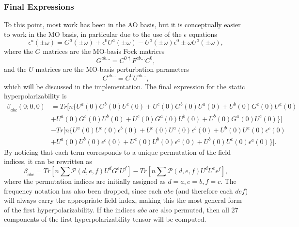 \subsubsection{Final Expressions}

To this point, most work has been in the AO basis, but it is conceptually easier to work in the MO basis, in particular due to the use of the \(\epsilon\) equations
\begin{equation}
  \epsilon^{a}(\pm\omega) = G^{a}(\pm\omega) + \epsilon^{0} U^{a}(\pm\omega) - U^{a}(\pm\omega) \epsilon^{0} \pm \omega U^{a}(\pm\omega), \tag{Karna 34}
\end{equation}
where the \(G\) matrices are the MO-basis Fock matrices
\begin{equation}
  G^{ab\dots} = C^{0\dagger} F^{ab\dots} C^{0},
\end{equation}
and the \(U\) matrices are the MO-basis perturbation parameters
\begin{equation}
  C^{ab\dots} = C^{0} U^{ab\dots},
\end{equation}
which will be discussed in the implementation. The final expression for the static hyperpolarizability is
\begin{equation}
  \begin{split}
    \beta_{abc}(0; 0, 0) &= Tr[n \{U^{a}(0) G^{b}(0) U^{c}(0) + U^{c}(0) G^{b}(0) U^{a}(0) + U^{b}(0) G^{c}(0) U^{a}(0) \\
    &+ U^{a}(0) G^{c}(0) U^{b}(0) + U^{c}(0) G^{a}(0) U^{b}(0) + U^{b}(0) G^{a}(0) U^{c}(0)\} ] \\
    &- Tr[n \{ U^{a}(0) U^{c}(0) \epsilon^{b}(0) + U^{c}(0) U^{a}(0) \epsilon^{b}(0) + U^{b}(0) U^{a}(0) \epsilon^{c}(0) \\
    &+ U^{a}(0) U^{b}(0) \epsilon^{c}(0) + U^{c}(0) U^{b}(0) \epsilon^{a}(0) + U^{b}(0) U^{c}(0) \epsilon^{a}(0) \} ].
  \end{split} \tag{Karna VII-4}
\end{equation}
By noticing that each term corresponds to a unique permutation of the field indices, it can be rewritten as
\begin{equation}
  \beta_{abc} = Tr\left[ n \sum \mathcal{P}(d,e,f) U^{d} G^{e} U^{f} \right] - Tr\left[ n \sum \mathcal{P}(d,e,f) U^{d} U^{e} \epsilon^{f} \right],
\end{equation}
where the permutation indices are initially assigned as \(d = a, e = b, f = c\). The frequency notation has also been dropped, since each \(abc\) (and therefore each \(def\)) will always carry the appropriate field index, making this the most general form of the first hyperpolarizability. If the indices \(abc\) are also permuted, then all 27 components of the first hyperpolarizability tensor will be computed.

